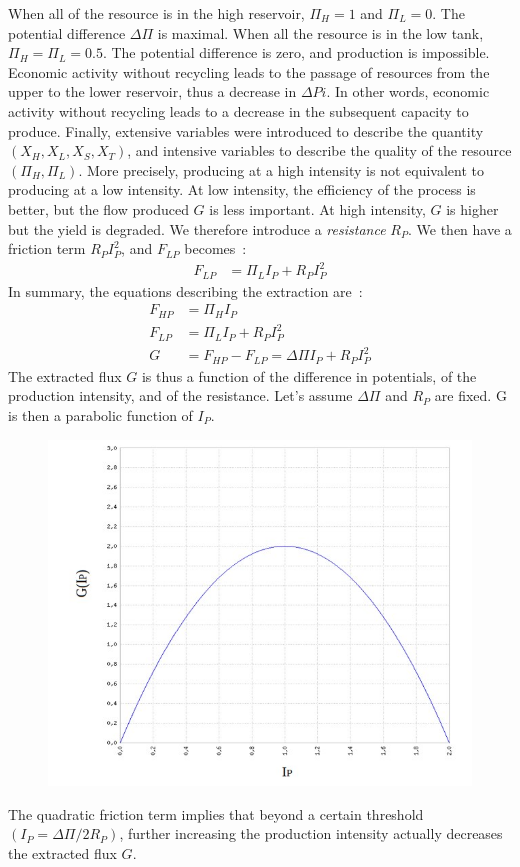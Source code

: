\documentclass[12pt,a4paper]{article}%
\begin{document}
\begin{appendix}
When all of the resource is in the high reservoir, $\Pi_{H}=1$ and $\Pi _{L}=0$. The potential difference $\Delta \Pi$ is maximal. When all the resource is in the low tank, $\Pi_{H}=\Pi_{L}=0.5$. The potential difference is zero, and production is impossible. Economic activity without recycling leads to the passage of resources from the upper to the lower reservoir, thus a decrease in $\Delta Pi$. In other words, economic activity without recycling leads to a decrease in the subsequent capacity to produce.  Finally, extensive variables were introduced to describe the quantity $(X_{H},X_{L},X_{S},X_{T})$, and intensive variables to describe the quality of the resource $(\Pi_{H},\Pi_{L})$.
More precisely, producing at a high intensity is not equivalent to producing at a low intensity. At low intensity, the efficiency of the process is better, but the flow produced $G$ is less important. At high intensity, $G$ is higher but the yield is degraded.  We therefore introduce a \textit{resistance} $R_{P}$. We then have a friction term $R_{P}I_{P}^{2}$, and $F_{LP}$ becomes~:
\begin{align}
	F_{LP} &= \Pi_{L}I_{P}+R_{P}I_{P}^{2}
\end{align}
In summary, the equations describing the extraction are~: 
\begin{align} 
	F_{HP} & =\Pi_{H}I_{P} \\
	F_{LP} & =\Pi_{L}I_{P}+R_{P}I_{P}^{2} \\
	G & =F_{HP}-F_{LP}=\Delta \Pi I_{P}+R_{P}I_{P}^{2}
\end{align} 
The extracted flux $G$ is thus a function of the difference in potentials, of the production intensity, and of the resistance. Let's assume $\Delta \Pi$ and $R_{P}$ are fixed. G is then a parabolic function of $I_{P}$.  
\begin{figure}[h] 
	\centering 
	\includegraphics[width=1.0\textwidth]{figures/Prod-I.jpg}
\end{figure} 
The quadratic friction term implies that beyond a certain threshold $(I_{P}=\Delta\Pi/2R_{P})$, further increasing the production intensity actually decreases the extracted flux $G$. 


\end{appendix}
\end{document}
